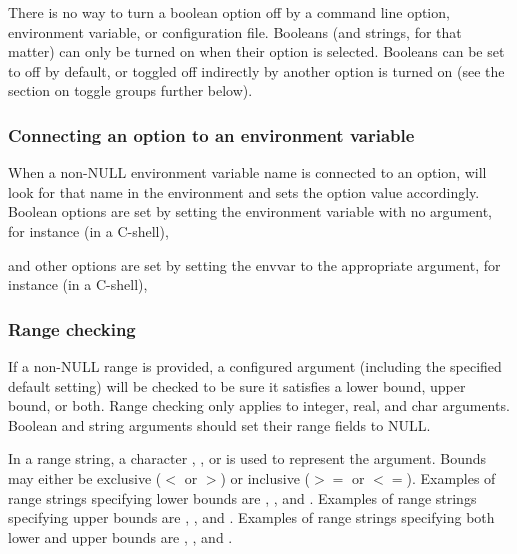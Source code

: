 There is no way to turn a boolean option off by a command line option,
environment variable, or configuration file. Booleans (and strings,
for that matter) can only be turned on when their option is
selected. Booleans can be set to off by default, or toggled off
indirectly by another option is turned on (see the section on toggle
groups further below).

   \subsubsection{Connecting an option to an environment variable}

When a non-NULL environment variable name is connected to an option,
 will look for that name in the
environment and sets the option value accordingly. Boolean options are
set by setting the environment variable with no argument, for instance
(in a C-shell),

\begin{cchunk}
\end{cchunk}

and other options are set by setting the envvar to the appropriate
argument, for instance (in a C-shell),

\begin{cchunk}
\end{cchunk}

   \subsubsection{Range checking}

If a non-NULL range is provided, a configured argument (including the
specified default setting) will be checked to be sure it satisfies a
lower bound, upper bound, or both. Range checking only applies to
integer, real, and char arguments. Boolean and string arguments should
set their range fields to NULL.

In a range string, a character , , or  is
used to represent the argument. Bounds may either be exclusive ($<$ or
$>$) or inclusive ($>=$ or $<=$). Examples of range strings specifying
lower bounds are , , and
. Examples of range strings specifying upper bounds are
, , and . Examples of
range strings specifying both lower and upper bounds are
, , and .

